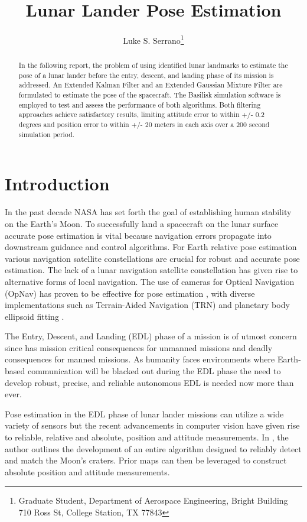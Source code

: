 \documentclass[conf]{new-aiaa}
\title{Lunar Lander Pose Estimation}
\author{Luke S. Serrano\footnote{Graduate Student, Department of Aerospace Engineering, Bright Building 710 Ross St, College Station, TX 77843}}
\affil{Texas A\&M University Department of Aerospace Engineering, College Station, TX 77843 }
\begin{document}
\maketitle

\begin{abstract}
In the following report, the problem of using identified lunar landmarks to estimate the pose of a lunar lander before the entry, descent, and landing phase of its mission is addressed. An Extended Kalman Filter and an Extended Gaussian Mixture Filter are formulated to estimate the pose of the spacecraft. The Basilisk simulation software is employed to test and assess the performance of both algorithms. Both filtering approaches achieve satisfactory results, limiting attitude error to within +/- 0.2 degrees and position error to within +/- 20 meters in each axis over a 200 second simulation period. 


\end{abstract}

\section{Introduction}
In the past decade NASA has set forth the goal of establishing human stability on the Earth's Moon. To successfully land a spacecraft on the lunar surface accurate pose estimation is vital because navigation errors propagate into downstream guidance and control algorithms. For Earth relative pose estimation various navigation satellite constellations are crucial for robust and accurate pose estimation. The lack of a lunar navigation satellite constellation has given rise to alternative forms of local navigation. The use of cameras for Optical Navigation (OpNav) has proven to be effective for pose estimation \cite{holt2018orion}, with diverse implementations such as Terrain-Aided Navigation (TRN) and planetary body ellipsoid fitting \cite{christian2021tutorial}.

The Entry, Descent, and Landing (EDL) phase of a mission is of utmost concern since has mission critical consequences for unmanned missions and deadly consequences for manned missions. As humanity faces environments where Earth-based communication will be blacked out during the EDL phase the need to develop robust, precise, and reliable autonomous EDL is needed now more than ever.

Pose estimation in the EDL phase of lunar lander missions can utilize a wide variety of sensors \cite{johnson2008overview} but the recent advancements in computer vision have given rise to reliable, relative and absolute, position and attitude measurements. In \cite{maass2020crater}, the author outlines the development of an entire algorithm designed to reliably detect and match the Moon's craters. Prior maps can then be leveraged to construct absolute position and attitude measurements.
\end{document}
